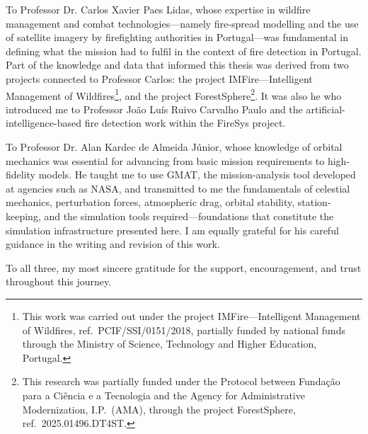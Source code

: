 To Professor Dr. Carlos Xavier Paes Lidas, whose expertise in wildfire management and combat technologies---namely fire-spread modelling and the use of satellite imagery by firefighting authorities in Portugal---was fundamental in defining what the mission had to fulfil in the context of fire detection in Portugal. Part of the knowledge and data that informed this thesis was derived from two projects connected to Professor Carlos: the project IMFire---Intelligent Management of Wildfires\footnote{This work was carried out under the project IMFire---Intelligent Management of Wildfires, ref.\ PCIF/SSI/0151/2018, partially funded by national funds through the Ministry of Science, Technology and Higher Education, Portugal.}, and the project ForestSphere\footnote{This research was partially funded under the Protocol between Fundação para a Ciência e a Tecnologia and the Agency for Administrative Modernization, I.P.\ (AMA), through the project ForestSphere, ref.\ 2025.01496.DT4ST.}. It was also he who introduced me to Professor João Luís Ruivo Carvalho Paulo and the artificial-intelligence-based fire detection work within the FireSys project.

To Professor Dr. Alan Kardec de Almeida Júnior, whose knowledge of orbital mechanics was essential for advancing from basic mission requirements to high-fidelity models. He taught me to use GMAT, the mission-analysis tool developed at agencies such as NASA, and transmitted to me the fundamentals of celestial mechanics, perturbation forces, atmospheric drag, orbital stability, station-keeping, and the simulation tools required---foundations that constitute the simulation infrastructure presented here. I am equally grateful for his careful guidance in the writing and revision of this work.

To all three, my most sincere gratitude for the support, encouragement, and trust throughout this journey.

